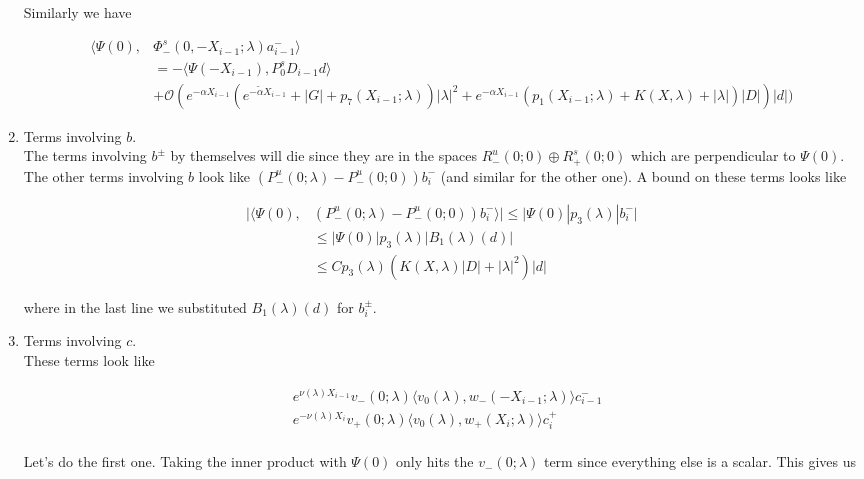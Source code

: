 \documentclass[12pt]{article}
\begin{document}
\begin{enumerate}
Similarly we have

\begin{align*}
\langle \Psi(0), &\Phi^s_-(0, -X_{i-1}; \lambda)a_{i-1}^- \rangle \\
&= -\langle \Psi(-X_{i-1}), P^s_0 D_{i-1} d \rangle \\
&+ \mathcal{O}(e^{-\alpha X_{i-1}}(e^{-\tilde{\alpha} X_{i-1}} + |G| + p_7(X_{i-1}; \lambda))|\lambda|^2 + e^{-\alpha X_{i-1}}(p_1(X_{i-1}; \lambda) + K(X, \lambda) + |\lambda|) |D|)|d|)
\end{align*}

\item Terms involving $b$.\\

The terms involving $b^\pm$ by themselves will die since they are in the spaces $R^u_-(0; 0) \oplus R^s_+(0; 0)$ which are perpendicular to $\Psi(0)$.\\

The other terms involving $b$ look like $(P^u_-(0; \lambda) - P^u_-(0; 0))b_i^-$ (and similar for the other one). A bound on these terms looks like

\begin{align*}
|\langle \Psi(0), &(P^u_-(0; \lambda) - P^u_-(0; 0))b_i^- \rangle|
\leq |\Psi(0)| p_3(\lambda)|b_i^-| \\
&\leq |\Psi(0)| p_3(\lambda)|B_1(\lambda)(d)| \\
&\leq C p_3(\lambda) ( K(X, \lambda) |D|+ |\lambda|^2 )|d|
\end{align*}

where in the last line we substituted $B_1(\lambda)(d)$ for $b_i^\pm$.\\

\item Terms involving $c$.\\

These terms look like

\begin{align*}
&e^{\nu(\lambda)X_{i-1}} v_-(0; \lambda) \langle v_0(\lambda), w_-(-X_{i-1}; \lambda) \rangle c_{i-1}^- \\
&e^{-\nu(\lambda)X_i} v_+(0; \lambda) \langle v_0(\lambda), w_+(X_i; \lambda) \rangle c_i^+ \\
\end{align*}

Let's do the first one. Taking the inner product with $\Psi(0)$ only hits the $v_-(0; \lambda)$ term since everything else is a scalar. This gives us 


\end{enumerate}
\end{document}
